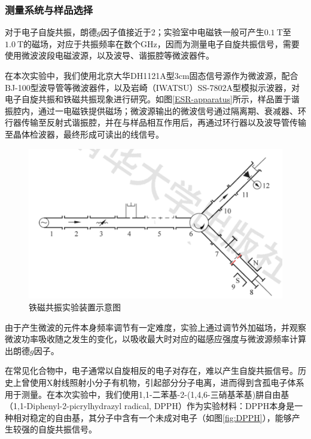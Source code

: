 \documentclass{thuemp}
\begin{document}
    \subsubsection{测量系统与样品选择}
    
    对于电子自旋共振，朗德$g$因子值接近于2；实验室中电磁铁一般可产生$0.1 ~\text{T} $至$1.0~\text{T}$的磁场，对应于共振频率在数个\si{\giga\hertz}，因而为测量电子自旋共振信号，需要使用微波波段电磁波源，以及波导、谐振腔等微波器件。
    
    在本次实验中，我们使用北京大华DH1121A型3\si{\centi\meter}固态信号源作为微波源，配合BJ-100型波导管等微波器件，以及岩崎（IWATSU）SS-7802A型模拟示波器，对电子自旋共振和铁磁共振现象进行研究。如图\ref{ESR-apparatus}所示，样品置于谐振腔内，通过一电磁铁提供磁场；微波源输出的微波信号通过隔离期、衰减器、环行器传输至反射式谐振腔，并在与样品相互作用后，再通过环行器以及波导管传输至晶体检波器，最终形成可读出的线信号。
    
    \begin{figure}[H]
        \centering
        \includegraphics[width=0.8\linewidth]{./ESR-apparatus.png}
        \caption{铁磁共振实验装置示意图} \label{fig:ESR-apparatus}
    \end{figure}
    
    由于产生微波的元件本身频率调节有一定难度，实验上通过调节外加磁场，并观察微波功率吸收随之发生的变化，以吸收最大时对应的磁感应强度与微波源频率计算出朗德$g$因子。
    
    在常见化合物中，电子通常以自旋相反的电子对存在，难以产生自旋共振信号。历史上曾使用X射线照射小分子有机物，引起部分分子电离，进而得到含孤电子体系用于测量。在本次实验中，我们使用1,1-二苯基-2-(1,4,6-三硝基苯基)肼自由基（1,1-Diphenyl-2-picrylhydrazyl radical, DPPH）作为实验材料：DPPH本身是一种相对稳定的自由基，其分子中含有一个未成对电子（如图\ref{fig:DPPH}），能够产生较强的自旋共振信号。\
    
\end{document}
